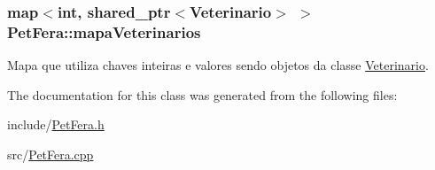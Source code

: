 \subsubsection[{\texorpdfstring{mapa\+Veterinarios}{mapaVeterinarios}}]{\setlength{\rightskip}{0pt plus 5cm}map$<$int, shared\+\_\+ptr$<${\bf Veterinario}$>$ $>$ Pet\+Fera\+::mapa\+Veterinarios\hspace{0.3cm}{\ttfamily [protected]}}\hypertarget{classPetFera_a2bed2112a627bbdb3c0338654330a1ab}{}\label{classPetFera_a2bed2112a627bbdb3c0338654330a1ab}


Mapa que utiliza chaves inteiras e valores sendo objetos da classe \hyperlink{classVeterinario}{Veterinario}. 



The documentation for this class was generated from the following files\+:\begin{DoxyCompactItemize}
\item 
include/\hyperlink{PetFera_8h}{Pet\+Fera.\+h}\item 
src/\hyperlink{PetFera_8cpp}{Pet\+Fera.\+cpp}\end{DoxyCompactItemize}
